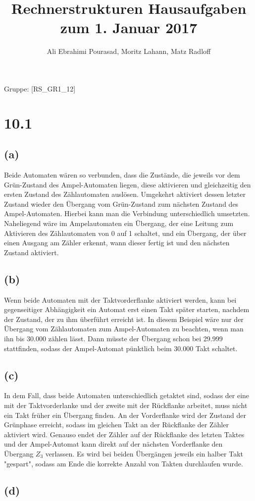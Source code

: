 \documentclass[11pt,a4paper]{article}
\title{\textbf{Rechnerstrukturen Hausaufgaben zum 1. Januar 2017}}
\author{Ali Ebrahimi Pourasad, Moritz Lahann, Matz Radloff}
\begin{document}
  \maketitle
  \date{}
  Gruppe: [RS\_GR1\_12]
\newpage
\section*{10.1}

\subsection*{(a)}

Beide Automaten wären so verbunden, dass die Zustände, die jeweils vor dem Grün-Zustand des Ampel-Automaten liegen, diese aktivieren und gleichzeitig den ersten Zustand des Zählautomaten auslösen. Umgekehrt aktiviert dessen letzter Zustand wieder den Übergang vom Grün-Zustand zum nächsten Zustand des Ampel-Automaten. Hierbei kann man die Verbindung unterschiedlich umsetzten. Naheliegend wäre im Ampelautomaten ein Übergang, der eine Leitung zum Aktivieren des Zählautomaten von 0 auf 1 schaltet, und ein Übergang, der über einen Ausgang am Zähler erkennt, wann dieser fertig ist und den nächsten Zustand aktiviert.

\subsection*{(b)}

Wenn beide Automaten mit der Taktvorderflanke aktiviert werden, kann bei gegenseitiger Abhängigkeit ein Automat erst einen Takt später starten, nachdem der Zustand, der zu ihm überführt erreicht ist. In diesem Beispiel wäre nur der Übergang vom Zählautomaten zum Ampel-Automaten zu beachten, wenn man ihn bis $30.000$ zählen lässt. Dann müsste der Übergang schon bei 29.999 stattfinden, sodass der Ampel-Automat pünktlich beim 30.000 Takt schaltet.

\subsection*{(c)}

In dem Fall, dass beide Automaten unterschiedlich getaktet sind, sodass der eine mit der Taktvorderlanke und der zweite mit der Rückflanke arbeitet, muss nicht ein Takt früher ein Übergang finden. An der Vorderflanke wird der Zustand der Grünphase erreicht, sodass im gleichen Takt an der Rückflanke der Zähler aktiviert wird. Genauso endet der Zähler auf der Rückflanke des letzten Taktes und der Ampel-Automat kann direkt auf der nächsten Vorderflanke den Übergang $Z_3$ verlassen. Es wird bei beiden Übergängen jeweils ein halber Takt "gespart", sodass am Ende die korrekte Anzahl von Takten durchlaufen wurde.

\subsection*{(d)}
\end{document}
